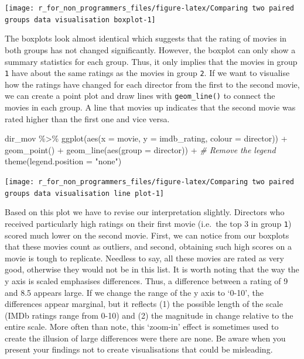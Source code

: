 \documentclass[
]{book}
\newenvironment{Shaded}{\begin{snugshade}}{\end{snugshade}}
\newcommand{\AttributeTok}[1]{\textcolor[rgb]{0.77,0.63,0.00}{#1}}
\newcommand{\CommentTok}[1]{\textcolor[rgb]{0.56,0.35,0.01}{\textit{#1}}}
\newcommand{\FunctionTok}[1]{\textcolor[rgb]{0.00,0.00,0.00}{#1}}
\newcommand{\NormalTok}[1]{#1}
\newcommand{\SpecialCharTok}[1]{\textcolor[rgb]{0.00,0.00,0.00}{#1}}
\newcommand{\StringTok}[1]{\textcolor[rgb]{0.31,0.60,0.02}{#1}}
\begin{document}
\begin{center}\texttt{[image: r\_for\_non\_programmers\_files/figure-latex/Comparing two paired groups data visualisation boxplot-1]} \end{center}

The boxplots look almost identical which suggests that the rating of movies in both groups has not changed significantly. However, the boxplot can only show a summary statistics for each group. Thus, it only implies that the movies in group \texttt{1} have about the same ratings as the movies in group \texttt{2}. If we want to visualise how the ratings have changed for each director from the first to the second movie, we can create a point plot and draw lines with \texttt{geom\_line()} to connect the movies in each group. A line that movies up indicates that the second movie was rated higher than the first one and vice versa.

\begin{Shaded}
\begin{Highlighting}[]
\NormalTok{dir\_mov }\SpecialCharTok{\%\textgreater{}\%}
  \FunctionTok{ggplot}\NormalTok{(}\FunctionTok{aes}\NormalTok{(}\AttributeTok{x =}\NormalTok{ movie, }\AttributeTok{y =}\NormalTok{ imdb\_rating, }\AttributeTok{colour =}\NormalTok{ director)) }\SpecialCharTok{+}
  \FunctionTok{geom\_point}\NormalTok{() }\SpecialCharTok{+}
  \FunctionTok{geom\_line}\NormalTok{(}\FunctionTok{aes}\NormalTok{(}\AttributeTok{group =}\NormalTok{ director)) }\SpecialCharTok{+}
  \CommentTok{\# Remove the legend}
  \FunctionTok{theme}\NormalTok{(}\AttributeTok{legend.position =} \StringTok{"none"}\NormalTok{)}
\end{Highlighting}
\end{Shaded}

\begin{center}\texttt{[image: r\_for\_non\_programmers\_files/figure-latex/Comparing two paired groups data visualisation line plot-1]} \end{center}

Based on this plot we have to revise our interpretation slightly. Directors who received particularly high ratings on their first movie (i.e.~the top 3 in group \texttt{1}) scored much lower on the second movie. First, we can notice from our boxplots that these movies count as outliers, and second, obtaining such high scores on a movie is tough to replicate. Needless to say, all these movies are rated as very good, otherwise they would not be in this list. It is worth noting that the way the y axis is scaled emphasises differences. Thus, a difference between a rating of 9 and 8.5 appears large. If we change the range of the y axis to `0-10', the differences appear marginal, but it reflects (1) the possible length of the scale (IMDb ratings range from 0-10) and (2) the magnitude in change relative to the entire scale. More often than note, this `zoom-in' effect is sometimes used to create the illusion of large differences were there are none. Be aware when you present your findings not to create visualisations that could be misleading.
\end{document}
